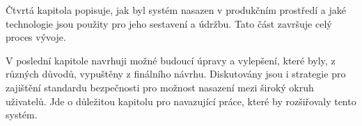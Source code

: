 Čtvrtá kapitola popisuje, jak byl systém nasazen v produkčním prostředí a jaké technologie jsou použity pro jeho sestavení a údržbu. Tato část završuje celý proces vývoje.

V poslední kapitole navrhuji možné budoucí úpravy a vylepšení, které byly, z různých důvodů, vypuštěny z finálního návrhu. Diskutovány jsou i strategie pro zajištění standardu bezpečnosti pro možnost nasazení mezi široký okruh uživatelů. Jde o důležitou kapitolu pro navazující práce, které by rozšiřovaly tento systém.
